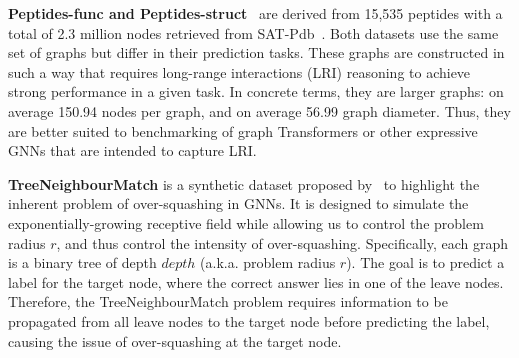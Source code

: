 \documentclass{article}
\begin{document}
{\textbf{Peptides-func and Peptides-struct}~\citep{dwivedi2022long}
are derived from 15,535 peptides with a total of 2.3 million nodes retrieved from SAT-Pdb~\citep{singh2016satpdb}. Both datasets use the same set of graphs but differ in their prediction tasks. These graphs are constructed in such a way that requires long-range interactions (LRI) reasoning to achieve strong performance in a given task. In concrete terms, they are larger graphs: on average 150.94 nodes per graph, and on average 56.99 graph diameter. Thus, they are better suited to benchmarking of graph Transformers or other expressive GNNs that are intended to capture LRI.}

\textbf{TreeNeighbourMatch} is a synthetic dataset proposed by~\citet{alon2020bottleneck} to highlight the inherent problem of over-squashing in GNNs. It is designed to simulate the exponentially-growing receptive field while allowing us to control the problem radius $r$, and thus control the intensity of over-squashing. Specifically, each graph is a binary tree of depth $depth$ (a.k.a. problem radius $r$). The goal is to predict a label for the target node, where the correct answer lies in one of the leave nodes. Therefore, the TreeNeighbourMatch problem requires information to be propagated from all leave nodes to the target node before predicting the label, causing the issue of over-squashing at the target node.
\end{document}
